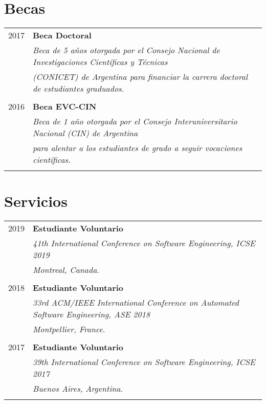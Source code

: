 \documentclass[a4paper,10pt]{article} %
\begin{document}
\section{Becas}
\begin{tabular}{rl}
\\
\textsc{2017} & \textbf{Beca Doctoral} \\ 
& \textit{Beca de 5 años otorgada por el Consejo Nacional de Investigaciones Científicas y Técnicas} \\
& \textit{(CONICET) de Argentina para financiar la carrera doctoral de estudiantes graduados.} \\ & \\

\textsc{2016} & \textbf{Beca EVC-CIN} \\ 
& \textit{Beca de 1 año otorgada por el Consejo Interuniversitario Nacional (CIN) de Argentina} \\
& \textit{para alentar a los estudiantes de grado a seguir vocaciones científicas.} \\ & \\

\end{tabular}

\section{Servicios}
\begin{longtable}{rl}
\textsc{2019}	& \textbf{Estudiante Voluntario} \\ 
& \textit{41th International Conference on Software Engineering, ICSE 2019} \\ 
& \textit{Montreal, Canada}. \\ & \\

\textsc{2018}	& \textbf{Estudiante Voluntario} \\
& \textit{33rd ACM/IEEE International Conference on Automated Software Engineering, ASE 2018} \\
& \textit{Montpellier, France}. \\ & \\

\textsc{2017}	& \textbf{Estudiante Voluntario} \\ 
& \textit{39th International Conference on Software Engineering, ICSE 2017} \\ 
& \textit{Buenos Aires, Argentina}. \\ & \\
\end{longtable}
\end{document}
